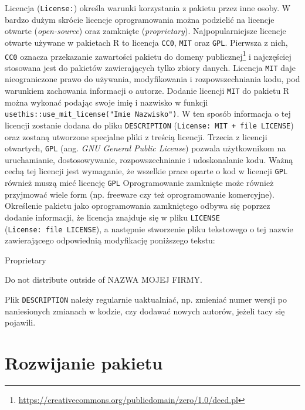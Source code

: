 \documentclass[paper=6in:9in,pagesize=pdftex,headinclude=on,footinclude=on,10pt]{scrbook}
\newenvironment{Shaded}{\begin{snugshade}}{\end{snugshade}}
\newcommand{\NormalTok}[1]{#1}
\DeclareRobustCommand{\href}[2]{#2\footnote{\url{#1}}}
\begin{document}
Licencja (\texttt{License:}) określa warunki korzystania z pakietu przez inne osoby.
W bardzo dużym skrócie licencje oprogramowania można podzielić na licencje otwarte (\emph{open-source}) oraz zamknięte (\emph{proprietary}).
Najpopularniejsze licencje otwarte używane w pakietach R to licencja \texttt{CC0}, \texttt{MIT} oraz \texttt{GPL}.
Pierwsza z nich, \texttt{CC0} oznacza przekazanie \href{https://creativecommons.org/publicdomain/zero/1.0/deed.pl}{zawartości pakietu do domeny publicznej} i najczęściej stosowana jest do pakietów zawierających tylko zbiory danych.
Licencja \texttt{MIT} daje nieograniczone prawo do używania, modyfikowania i rozpowszechniania kodu, pod warunkiem zachowania informacji o autorze.
Dodanie licencji \texttt{MIT} do pakietu R można wykonać podając swoje imię i nazwisko w funkcji \texttt{usethis::use\_mit\_license("Imie\ Nazwisko")}.
W ten sposób informacja o tej licencji zostanie dodana do pliku \texttt{DESCRIPTION} (\texttt{License:\ MIT\ +\ file\ LICENSE}) oraz zostaną utworzone specjalne pliki z treścią licencji.
Trzecia z licencji otwartych, \texttt{GPL} (ang. \emph{GNU General Public License}) pozwala użytkownikom na uruchamianie, dostosowywanie, rozpowszechnianie i udoskonalanie kodu.
Ważną cechą tej licencji jest wymaganie, że wszelkie prace oparte o kod w licencji \texttt{GPL} również muszą mieć licencję \texttt{GPL}
Oprogramowanie zamknięte może również przyjmować wiele form (np. freeware czy też oprogramowanie komercyjne).
Określenie pakietu jako oprogramowania zamkniętego odbywa się poprzez dodanie informacji, że licencja znajduje się w pliku \texttt{LICENSE} (\texttt{License:\ file\ LICENSE}), a następnie stworzenie pliku tekstowego o tej nazwie zawierającego odpowiednią modyfikację poniższego tekstu:

\begin{Shaded}
\begin{Highlighting}[]
\NormalTok{Proprietary }

\NormalTok{Do not distribute outside of NAZWA MOJEJ FIRMY.}
\end{Highlighting}
\end{Shaded}

Plik \texttt{DESCRIPTION} należy regularnie uaktualniać, np. zmieniać numer wersji po naniesionych zmianach w kodzie, czy dodawać nowych autorów, jeżeli tacy się pojawili.

\hypertarget{rozwijanie-pakietu}{%
\section{Rozwijanie pakietu}\label{rozwijanie-pakietu}}
\end{document}
